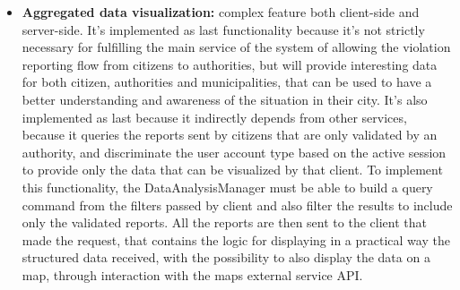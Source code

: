 \begin{itemize}
	\item \textbf{Aggregated data visualization:} complex feature both client-side and server-side. It's implemented as last functionality because it's not strictly necessary for fulfilling the main service of the system of allowing the violation reporting flow from citizens to authorities, but will provide interesting data for both citizen, authorities and municipalities, that can be used to have a better understanding and awareness of the situation in their city. It's also implemented as last because it indirectly depends from other services, because it queries the reports sent by citizens that are only validated by an authority, and discriminate the user account type based on the active session to provide only the data that can be visualized by that client. To implement this functionality, the DataAnalysisManager must be able to build a query command from the filters passed by client and also filter the results to include only the validated reports. All the reports are then sent to the client that made the request, that contains the logic for displaying in a practical way the structured data received, with the possibility to also display the data on a map, through interaction with the maps external service API.
\end{itemize}